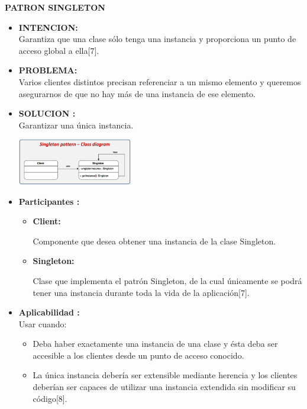 \documentclass[twoside,twocolumn]{article}
\begin{document}
	\item \textbf{PATRON SINGLETON}
	\begin{itemize}
		\item \textbf{INTENCION:}\\Garantiza que una clase sólo tenga una instancia y proporciona un punto de acceso global a ella[7]. 

		\item \textbf{PROBLEMA:}\\ Varios clientes distintos precisan referenciar a un mismo elemento y queremos asegurarnos de que no hay más de una instancia de ese elemento. 

		\item \textbf{SOLUCION :}\\ Garantizar una única instancia. 
			\begin{center}
			    \includegraphics[width=5cm]{./img/imagen1.png} 
            \end{center}
		\item \textbf{Participantes :}	
        \begin{itemize}
            \item \textbf{	Client:}	
            \begin{itemize}
                Componente que desea obtener una instancia de la clase Singleton.
            \end{itemize}
        \item \textbf{Singleton:}	
            \begin{itemize}
                Clase que implementa el patrón Singleton, de la cual únicamente se podrá tener una instancia durante toda la vida de la aplicación[7].  	
            \end{itemize}
        \end{itemize}    

		\item \textbf{Aplicabilidad :}\\ Usar cuando: 
        \begin{itemize}
            \item Deba haber exactamente una instancia de una clase y ésta deba ser accesible a los clientes desde un punto de acceso conocido.  	
            \item La única instancia debería ser extensible mediante herencia y los clientes deberían ser capaces de utilizar una instancia extendida sin modificar su código[8]. 	
        \end{itemize}


\end{itemize}
\end{document}

